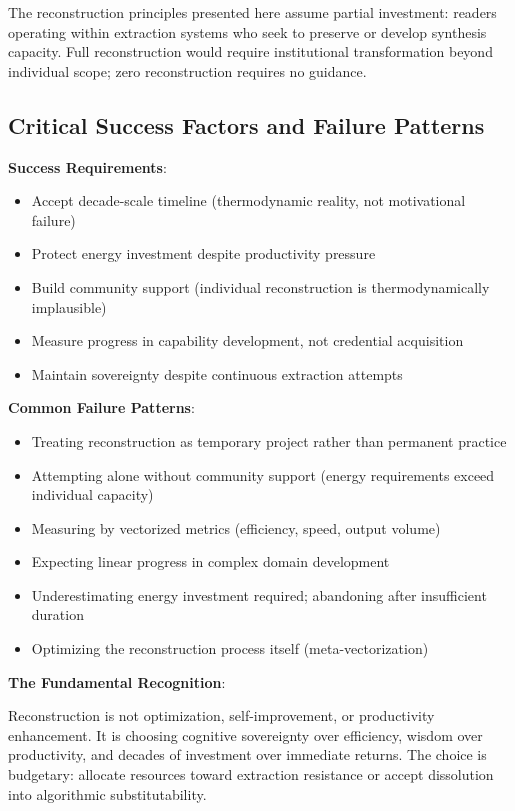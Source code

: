 The reconstruction principles presented here assume partial investment: readers operating within extraction systems who seek to preserve or develop synthesis capacity. Full reconstruction would require institutional transformation beyond individual scope; zero reconstruction requires no guidance.

\subsection{Critical Success Factors and Failure Patterns}

\textbf{Success Requirements}:
\begin{itemize}
\item Accept decade-scale timeline (thermodynamic reality, not motivational failure)
\item Protect energy investment despite productivity pressure
\item Build community support (individual reconstruction is thermodynamically implausible)
\item Measure progress in capability development, not credential acquisition
\item Maintain sovereignty despite continuous extraction attempts
\end{itemize}

\textbf{Common Failure Patterns}:
\begin{itemize}
\item Treating reconstruction as temporary project rather than permanent practice
\item Attempting alone without community support (energy requirements exceed individual capacity)
\item Measuring by vectorized metrics (efficiency, speed, output volume)
\item Expecting linear progress in complex domain development
\item Underestimating energy investment required; abandoning after insufficient duration
\item Optimizing the reconstruction process itself (meta-vectorization)
\end{itemize}

\textbf{The Fundamental Recognition}:

Reconstruction is not optimization, self-improvement, or productivity enhancement. It is choosing cognitive sovereignty over efficiency, wisdom over productivity, and decades of investment over immediate returns. The choice is budgetary: allocate resources toward extraction resistance or accept dissolution into algorithmic substitutability.

